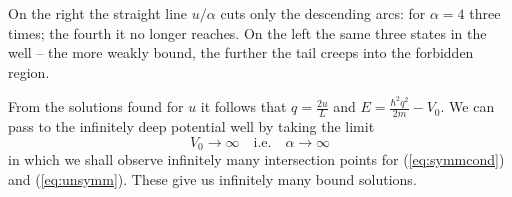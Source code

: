 

On the right the straight line $u/\alpha$ cuts only the descending arcs: for $\alpha=4$ three times; the fourth it no longer reaches. On the left the same three states in the well -- the more weakly bound, the further the tail creeps into the forbidden region.

From the solutions found for $u$ it follows that $q = \frac{2u}{L}$ and $E = \frac{\hbar^2q^2}{2m}-V_0$. We can pass to the infinitely deep potential well by taking the limit
\begin{equation}
	V_0\rightarrow \infty\quad \text{i.e.} \quad \alpha\rightarrow\infty
\end{equation}
in which we shall observe infinitely many intersection points for (\ref{eq:symmcond}) and (\ref{eq:unsymm}). These give us infinitely many bound solutions.

